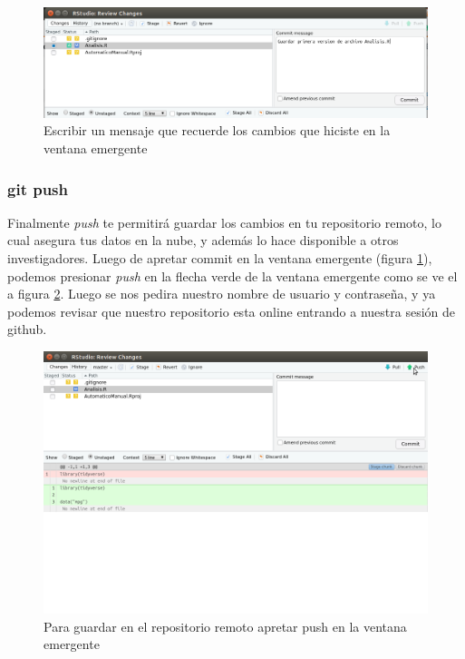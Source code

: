 \documentclass[]{book}
\begin{document}
\begin{figure}

{\centering \includegraphics[width=0.8\linewidth]{MensajeCommit} 

}

\caption{Escribir un mensaje que recuerde los cambios que hiciste en la ventana emergente}\label{fig:MensajeCommit}
\end{figure}

\hypertarget{git-push}{%
\subsubsection{git push}\label{git-push}}

Finalmente \emph{push} te permitirá guardar los cambios en tu
repositorio remoto, lo cual asegura tus datos en la nube, y además lo
hace disponible a otros investigadores. Luego de apretar commit en la
ventana emergente (figura \ref{fig:MensajeCommit}), podemos presionar
\emph{push} en la flecha verde de la ventana emergente como se ve el a
figura \ref{fig:push}. Luego se nos pedira nuestro nombre de usuario y
contraseña, y ya podemos revisar que nuestro repositorio esta online
entrando a nuestra sesión de github.

\begin{figure}

{\centering \includegraphics[width=0.8\linewidth]{Push} 

}

\caption{Para guardar en el repositorio remoto apretar push en la ventana emergente}\label{fig:push}
\end{figure}
\end{document}
